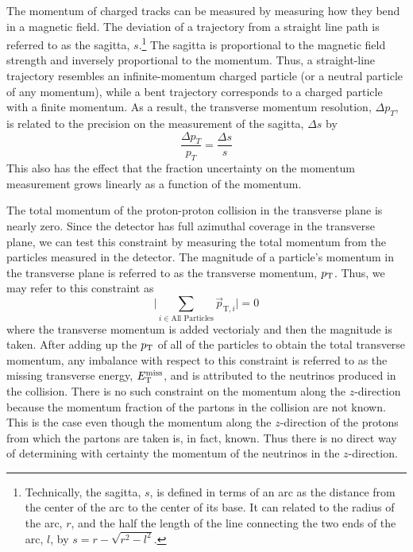 The momentum of charged tracks can be measured by measuring how they 
bend in a magnetic field. The deviation of a trajectory
from a straight line path is referred to as the 
sagitta, $s$.\footnote{Technically, the sagitta, $s$, is defined in terms
of an arc as the distance from the center of the arc to the center of its
base. It can related to the radius of the arc, $r$, and the half the length
of the line connecting the two ends of the arc, $l$, by 
$s=r-\sqrt{r^2-l^2}$.} The sagitta is proportional to the magnetic
field strength and inversely proportional to the momentum.
Thus, a straight-line trajectory resembles an infinite-momentum charged
particle (or a neutral particle of any momentum), while
a bent trajectory corresponds to a charged particle with a finite momentum.
As a result, the transverse momentum resolution, $\Delta p_T$, is related to the 
precision on the measurement of the sagitta, $\Delta s$ by
\begin{equation}
\frac{\Delta p_T }{p_T} = \frac{\Delta s}{s}
\label{eq:sagitta}
\end{equation}
This also has the effect that the fraction uncertainty on the momentum
measurement grows linearly as a function of the momentum.


The total momentum of the proton-proton collision in the transverse
plane is nearly zero. Since the detector has full azimuthal coverage 
in the transverse plane, we can test this constraint by measuring
the total momentum from the particles measured in the detector.
The magnitude of a particle's momentum 
in the transverse plane is referred to as the 
transverse momentum, $p_{\mathrm{T}}$.
Thus, we may refer to this constraint as
\begin{equation}
\Bigg| \sum_{i\in\textrm{All Particles}} \vec{p}_{\textrm{T},i} \Bigg| = 0
\end{equation}
where the transverse momentum is added vectorialy and then
the magnitude is taken.
After adding up the $p_{\mathrm{T}}$ of all of the particles to obtain
the total transverse momentum, 
any imbalance with respect to this constraint
is referred to as the
missing transverse energy, $E_{\mathrm{T}}^{\mathrm{miss}}$, and is attributed to the 
neutrinos produced in the collision. 
There is no such constraint on the momentum along the $z$-direction
because the momentum fraction of the partons in the collision are not known.
This is the case
even though the momentum along the $z$-direction of the 
protons from which the partons are taken is, in fact, known.
Thus there is no direct way of determining with certainty the 
momentum of the neutrinos in the $z$-direction.



